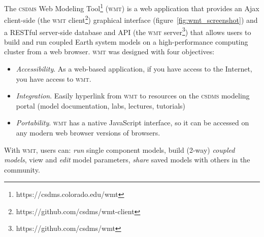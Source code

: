 \documentclass[11pt, oneside]{amsart}
\DeclareRobustCommand{\csdms}{\textsc{csdms}}
\DeclareRobustCommand{\wmt}{\textsc{wmt}}
\begin{document}
The \csdms{} Web Modeling Tool\footnote{https://csdms.colorado.edu/wmt}
(\wmt{}) is a web
application that provides an Ajax client-side (the \wmt{}
client\footnote{https://github.com/csdms/wmt-client}) graphical interface
(figure~\ref{fig:wmt_screenshot}) and a RESTful
server-side database and API (the \wmt{} server\footnote{https://github.com/csdms/wmt}) that allows users to build and run coupled Earth system models on
a high-performance computing cluster from a web browser. \wmt{} was designed
with four objectives:
\begin{itemize}

\item \emph{Accessibility}. As a web-based application, if you have access
      to the Internet, you have access to \wmt{}.

\item \emph{Integration}. Easily hyperlink from \wmt{} to resources on the 
      \csdms{} modeling portal (model documentation, labs, lectures,
      tutorials)

\item \emph{Portability}. \wmt{} has a native JavaScript interface, so it can
      be accessed on any modern web browser
      versions of browsers.


\end{itemize}
With \wmt{}, users can: \emph{run} single component models, build (2-way)
\emph{coupled models}, view and \emph{edit} model parameters, \emph{share}
saved models with others in the community.

\end{document}
